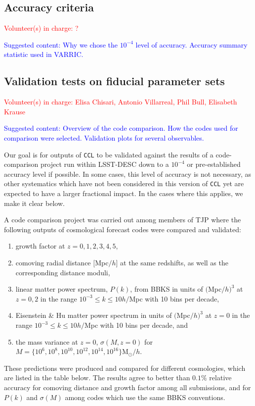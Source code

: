 \documentclass[\docopts]{\docclass}
\newcommand{\vol}[1]{\textcolor{red}{Volunteer(s) in charge: #1}}
\newcommand{\cont}[1]{\textcolor{blue}{Suggested content: #1}}
\newcommand{\ccl}{{\tt CCL}\xspace}
\begin{document}
\subsection{Accuracy criteria}
\vol{?}

\cont{Why we chose the $10^{-4}$ level of accuracy. Accuracy summary statistic used in VARRIC.}

\subsection{Validation tests on fiducial parameter sets}
\vol{Elisa Chisari, Antonio Villarreal, Phil Bull, Elisabeth Krause}

\cont{Overview of the code comparison. How the codes used for comparison were selected. Validation plots for several observables.}

Our goal is for outputs of \ccl to be validated against the results of a code-comparison project run within LSST-DESC down to a $10^{-4}$ or pre-established accuracy level if possible. In some cases, this level of accuracy is not necessary, as other systematics which have not been considered in this version of \ccl yet are expected to have a larger fractional impact. In the cases where this applies, we make it clear below.


A code comparison project was carried out among members of TJP where the following outputs of cosmological forecast codes were compared and validated:
\begin{enumerate}
\item growth factor at $z = 0,1,2,3,4,5$,
\item comoving radial distance $[$Mpc$/h]$ at the same redshifts, as well as the corresponding distance moduli,
\item linear matter power spectrum, $P(k)$, from BBKS \citep{BBKS} in units of $($Mpc$/h)^3$ at $z=0,2$ in the range $10^{-3} \leq k \leq 10 h/$Mpc with 10 bins per decade,
\item Eisenstein \& Hu matter power spectrum in units of $($Mpc$/h)^3$ at $z=0$ in the range $10^{-3} \leq k \leq 10 h/$Mpc with 10 bins per decade, and
\item the mass variance at $z=0$, $\sigma(M,z=0)$ for $M =\{10^6, 10^8, 10^{10}, 10^{12}, 10^{14}, 10^{16}\} $M$_\odot/h$.
\end{enumerate}
These predictions were produced and compared for different cosmologies, which are listed in the table below. The results agree to better than $0.1\%$ relative accuracy for comoving distance and growth factor among all submissions, and for $P(k)$ and $\sigma(M)$ among codes which use the same BBKS conventions.
\end{document}
